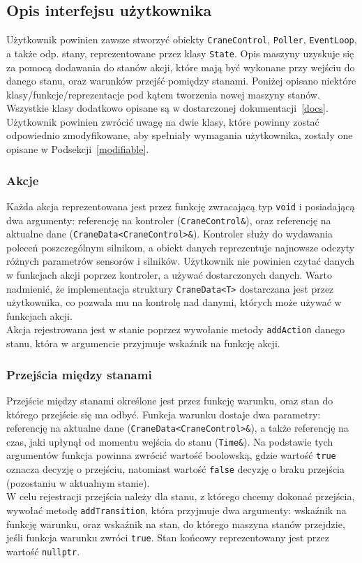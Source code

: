 \documentclass{article}
\begin{document}
\subsection{Opis interfejsu użytkownika}
Użytkownik powinien zawsze stworzyć obiekty \texttt{CraneControl}, \texttt{Poller},
\texttt{EventLoop}, a także odp. stany, reprezentowane przez klasy
\texttt{State}. Opis maszyny uzyskuje się za pomocą dodawania do stanów akcji,
które mają być wykonane przy wejściu do danego stanu, oraz warunków przejść
pomiędzy stanami. Poniżej opisano niektóre klasy/funkcje/reprezentacje pod kątem
tworzenia nowej maszyny stanów. Wszystkie klasy dodatkowo opisane są w
dostarczonej dokumentacji~\ref{docs}. Użytkownik powinien zwrócić uwagę na dwie
klasy, które powinny zostać odpowiednio zmodyfikowane, aby spełniały wymagania
użytkownika, zostały one opisane w Podsekcji~\ref{modifiable}.
\subsubsection*{Akcje}
Każda akcja reprezentowana jest przez funkcję zwracającą typ \texttt{void} i posiadającą dwa argumenty:
referencję na kontroler (\texttt{CraneControl\&}), oraz referencję na aktualne dane
(\texttt{CraneData<CraneControl>\&}). Kontroler służy do wydawania poleceń poszczególnym silnikom, a
obiekt danych reprezentuje najnowsze odczyty różnych parametrów sensorów i
silników. Użytkownik nie powinien czytać danych w funkcjach akcji poprzez
kontroler, a używać dostarczonych danych. Warto nadmienić, że
implementacja struktury \texttt{CraneData<T>} dostarczana jest przez użytkownika, co
pozwala mu na kontrolę nad danymi, których może używać w funkcjach akcji.\\
Akcja rejestrowana jest w stanie poprzez wywołanie metody \texttt{addAction}
danego stanu, która w argumencie przyjmuje wskaźnik na funkcję akcji.
\subsubsection*{Przejścia między stanami}
Przejście między stanami określone jest przez funkcję warunku, oraz stan do
którego przejście się ma odbyć. Funkcja warunku dostaje dwa parametry:
referencję na aktualne dane (\texttt{CraneData<CraneControl>\&}), a także
referencję na czas, jaki upłynął od momentu wejścia do stanu (\texttt{Time\&}).
Na podstawie tych argumentów funkcja powinna zwrócić wartość boolowską, gdzie
wartość \texttt{true} oznacza decyzję o przejściu, natomiast wartość
\texttt{false} decyzję o braku przejścia (pozostaniu w aktualnym stanie).\\
W celu rejestracji przejścia należy dla stanu, z którego chcemy dokonać
przejścia, wywołać metodę \texttt{addTransition}, która przyjmuje dwa argumenty:
wskaźnik na funkcję warunku, oraz wskaźnik na stan, do którego maszyna stanów
przejdzie, jeśli funkcja warunku zwróci \texttt{true}. Stan końcowy
reprezentowany jest przez wartość \texttt{nullptr}.
\end{document}
